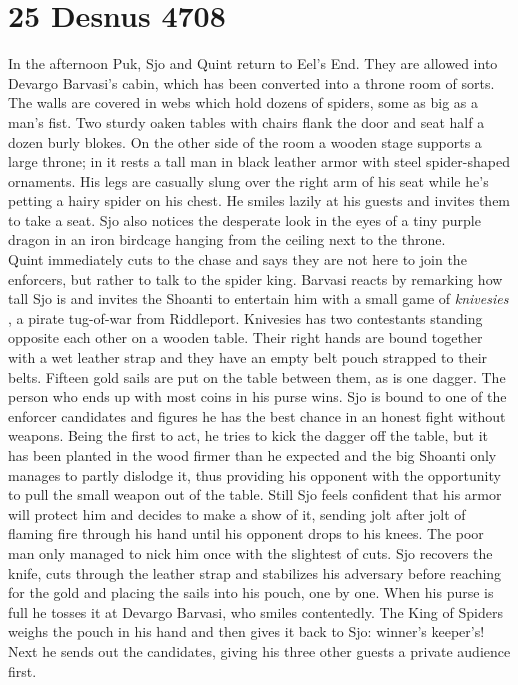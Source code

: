 \section{25 Desnus 4708}

In the afternoon Puk, Sjo and Quint return to Eel's End. They are allowed into Devargo Barvasi's cabin, which has been converted into a throne room of sorts. The walls are covered in webs which hold dozens of spiders, some as big as a man's fist. Two sturdy oaken tables with chairs flank the door and seat half a dozen burly blokes. On the other side of the room a wooden stage supports a large throne; in it rests a tall man in black leather armor with steel spider-shaped ornaments. His legs are casually slung over the right arm of his seat while he's petting a hairy spider on his chest. He smiles lazily at his guests and invites them to take a seat. Sjo also notices the desperate look in the eyes of a tiny purple dragon in an iron birdcage hanging from the ceiling next to the throne.\\

Quint immediately cuts to the chase and says they are not here to join the enforcers, but rather to talk to the spider king. Barvasi reacts by remarking how tall Sjo is and invites the Shoanti to entertain him with a small game of {\itshape knivesies} , a pirate tug-of-war from Riddleport. Knivesies has two contestants standing opposite each other on a wooden table. Their right hands are bound together with a wet leather strap and they have an empty belt pouch strapped to their belts. Fifteen gold sails are put on the table between them, as is one dagger. The person who ends up with most coins in his purse wins. Sjo is bound to one of the enforcer candidates and figures he has the best chance in an honest fight without weapons. Being the first to act, he tries to kick the dagger off the table, but it has been planted in the wood firmer than he expected and the big Shoanti only manages to partly dislodge it, thus providing his opponent with the opportunity to pull the small weapon out of the table. Still Sjo feels confident that his armor will protect him and decides to make a show of it, sending jolt after jolt of flaming fire through his hand until his opponent drops to his knees. The poor man only managed to nick him once with the slightest of cuts. Sjo recovers the knife, cuts through the leather strap and stabilizes his adversary before reaching for the gold and placing the sails into his pouch, one by one. When his purse is full he tosses it at Devargo Barvasi, who smiles contentedly. The King of Spiders weighs the pouch in his hand and then gives it back to Sjo: winner's keeper's! Next he sends out the candidates, giving his three other guests a private audience first.\\


